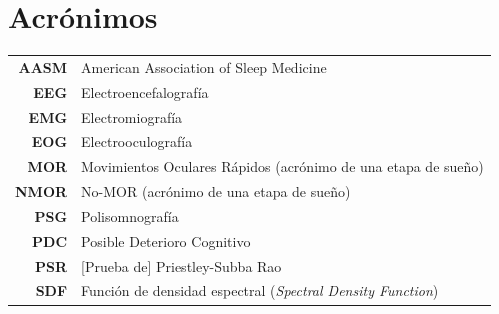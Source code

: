 \documentclass[12pt,a4paper]{mitthesis}
\begin{document}

\chapter*{Acr\'onimos}

\begin{tabular}{rl}
\textbf{AASM} & American Association of Sleep Medicine
\\
\textbf{EEG} & Electroencefalograf\'ia
\\
\textbf{EMG} & Electromiograf\'ia
\\
\textbf{EOG} & Electrooculograf\'ia
\\
\textbf{MOR} & Movimientos Oculares R\'apidos (acr\'onimo de una etapa de sue\~no)
\\
\textbf{NMOR}& No-MOR (acr\'onimo de una etapa de sue\~no)
\\
\textbf{PSG} & Polisomnograf\'ia
\\
\textbf{PDC} & Posible Deterioro Cognitivo
\\
\textbf{PSR} & [Prueba de] Priestley-Subba Rao
\\
\textbf{SDF} & Funci\'on de densidad espectral (\textit{Spectral Density Function})
\end{tabular}

\newpage


\thispagestyle{empty}

\tableofcontents
\newpage

\end{document}
